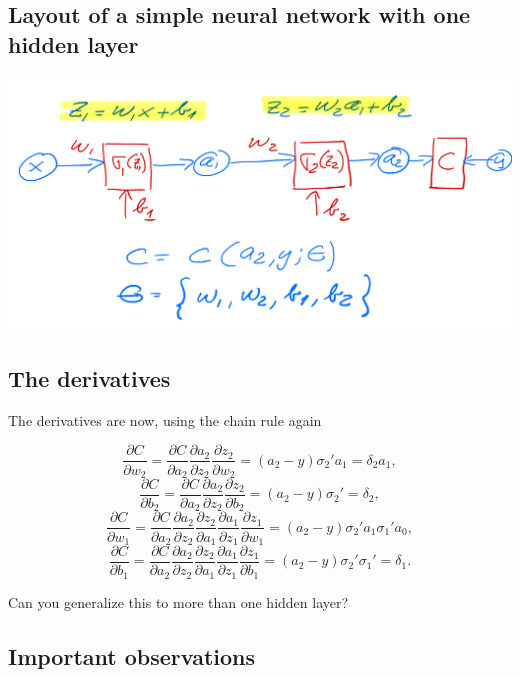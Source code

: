 \documentclass[%
oneside,                 %
final,                   %
10pt]{article}
\begin{document}
\subsection{Layout of a simple neural network with one hidden layer}

\vspace{6mm}

\centerline{\includegraphics[width=1.0\linewidth]{figures/simplenn2.png}}

\vspace{6mm}

\subsection{The derivatives}

The derivatives are now, using the chain rule again

\[
\frac{\partial C}{\partial w_2}=\frac{\partial C}{\partial a_2}\frac{\partial a_2}{\partial z_2}\frac{\partial z_2}{\partial w_2}=(a_2-y)\sigma_2'a_1=\delta_2a_1,
\]
\[
\frac{\partial C}{\partial b_2}=\frac{\partial C}{\partial a_2}\frac{\partial a_2}{\partial z_2}\frac{\partial z_2}{\partial b_2}=(a_2-y)\sigma_2'=\delta_2,
\]
\[
\frac{\partial C}{\partial w_1}=\frac{\partial C}{\partial a_2}\frac{\partial a_2}{\partial z_2}\frac{\partial z_2}{\partial a_1}\frac{\partial a_1}{\partial z_1}\frac{\partial z_1}{\partial w_1}=(a_2-y)\sigma_2'a_1\sigma_1'a_0,
\]
\[
\frac{\partial C}{\partial b_1}=\frac{\partial C}{\partial a_2}\frac{\partial a_2}{\partial z_2}\frac{\partial z_2}{\partial a_1}\frac{\partial a_1}{\partial z_1}\frac{\partial z_1}{\partial b_1}=(a_2-y)\sigma_2'\sigma_1'=\delta_1.
\]

Can you generalize this to more than one hidden layer?

\subsection{Important observations}
\end{document}
